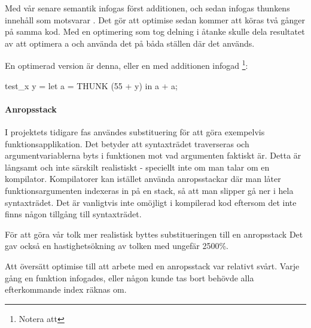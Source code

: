 \documentclass[Rapport]{subfiles}
\begin{document}
Med vår senare semantik infogas först additionen, och sedan infogas thunkens innehåll
som motsvarar . Det gör att optimise sedan kommer att
köras två gånger på samma kod. Med en optimering som tog delning i åtanke 
skulle dela resultatet av att optimera a och använda det på båda ställen där det används.

En optimerad version är denna, eller en med additionen infogad
\footnote{Notera att }:

\begin{codeEx}
test_x y = let
    { a = THUNK (55 + y)
    } in a + a;
\end{codeEx}

\paragraph{Anropsstack}

I projektets tidigare fas användes substituering för att göra exempelvis funktionsapplikation.
Det betyder att syntaxträdet traverseras och argumentvariablerna byts i funktionen
mot vad argumenten faktiskt är. Detta är långsamt och inte särskilt realistiskt - 
speciellt inte om man talar om en kompilator. Kompilatorer kan istället använda anropsstackar
där man låter funktionsargumenten indexeras in på en stack, så att man slipper
gå ner i hela syntaxträdet. Det är vanligtvis inte omöjligt i kompilerad kod eftersom
det inte finns någon tillgång till syntaxträdet.

För att göra vår tolk mer realistisk byttes substitueringen till en anropsstack 
Det gav också en hastighetsökning av tolken med ungefär 2500\%.


Att översätt optimise till att arbete med en anropsstack var relativt svårt. Varje gång en funktion infogades, eller någon  kunde tas bort behövde alla efterkommande index räknas om. 
\end{document}
